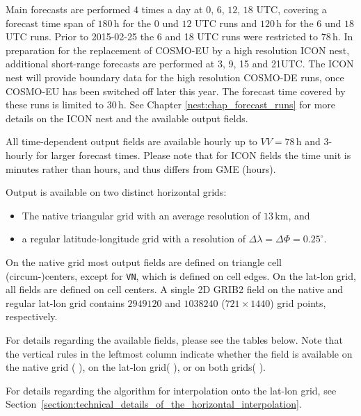 Main forecasts are performed $4$ times a day at $0,\, 6,\, 12,\, 18$ UTC, covering a forecast time span of $180\,\mathrm{h}$ for the 
$0$ und $12$ UTC runs and $120\,\mathrm{h}$ for the $6$ und $18$ UTC runs. Prior to 2015-02-25 the 6 and 18 UTC runs were restricted 
to $78\,\mathrm{h}$. In preparation for the replacement of COSMO-EU by a high resolution ICON nest, additional short-range forecasts 
are performed at 3, 9, 15 and 21UTC. The ICON nest will provide boundary data for the high resolution COSMO-DE runs, once COSMO-EU has 
been switched off later this year. The forecast time covered by these runs is limited to $30\,\mathrm{h}$. See Chapter 
\ref{nest:chap_forecast_runs} for more details on the ICON nest and the available output fields. 

All time-dependent output fields are available hourly up to
$VV=78\,\mathrm{h}$ and 3-hourly for larger forecast
times\footnotemark[2].
%
Please note that for ICON fields the time unit is minutes rather than
hours, and thus differs from GME (hours).

Output is available on two distinct horizontal grids: 
\begin{itemize}
  \item The native triangular grid with an average resolution of $13\,\mathrm{km}$, and
  \item a regular latitude-longitude grid with a resolution of $\Delta \lambda = \Delta \Phi=0.25^{\circ}$. 
\end{itemize}
On the native grid most output fields are defined on triangle cell
(circum-)centers, except for \texttt{VN}, which is defined on cell
edges. On the lat-lon grid, all fields are defined on cell centers.
%
A single 2D GRIB2 field on the native and regular lat-lon grid
contains $2949120$ and $1038240$ ($721 \times 1440$) grid points, respectively.



For details regarding the available fields, please see the tables below. Note that the vertical rules in the leftmost column indicate whether the field is 
available on the native grid ($\,$\markRed$\,$), on the lat-lon grid($\,$\markBlue$\,$), or on both grids($\,$\markRed\markBlue$\,$). 

For details regarding the algorithm for interpolation onto the lat-lon
grid, see
Section~\ref{section:technical_details_of_the_horizontal_interpolation}.



